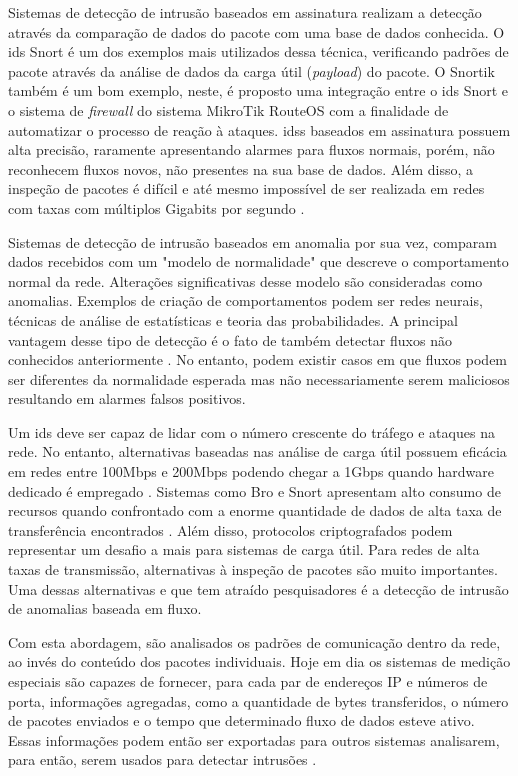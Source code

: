 Sistemas de detecção de intrusão baseados em assinatura realizam a detecção através da comparação de dados do pacote com uma base de dados conhecida. O \gls{ids} Snort \cite{Roesch:1999} é um dos exemplos mais utilizados dessa técnica, verificando padrões de pacote através da análise de dados da carga útil (\textit{payload}) do pacote. O Snortik \cite{Fagundes16} também é um bom exemplo, neste, é proposto uma integração entre o \gls{ids} Snort e o sistema de \textit{firewall} do sistema MikroTik RouteOS \cite{mikrotik16} com a finalidade de automatizar o processo de reação à ataques. \glspl{ids} baseados em assinatura possuem alta precisão, raramente apresentando alarmes para fluxos normais, porém, não reconhecem fluxos novos, não presentes na sua base de dados. Além disso, a inspeção de pacotes é difícil e até mesmo impossível de ser realizada  em redes com taxas com múltiplos Gigabits por segundo \cite{Lai:2004, Gao:2006}.

Sistemas de detecção de intrusão baseados em anomalia por sua vez, comparam dados recebidos com um "modelo de normalidade" que descreve o comportamento normal da rede. Alterações significativas desse modelo são consideradas como anomalias. Exemplos de criação de comportamentos podem ser redes neurais, técnicas de análise de estatísticas e teoria das probabilidades. A principal vantagem desse tipo de detecção é o fato de também detectar fluxos não conhecidos anteriormente \cite{Owezarski:2010}. No entanto, podem existir casos em que fluxos podem ser diferentes da normalidade esperada mas não necessariamente serem maliciosos resultando em alarmes falsos positivos.

Um \gls{ids} deve ser capaz de lidar com o número crescente do tráfego e ataques na rede. No entanto, alternativas baseadas nas análise de carga útil possuem eficácia em redes entre 100Mbps e 200Mbps \cite{Lai:2004, Gao:2006} podendo chegar a 1Gbps quando hardware dedicado é empregado \cite{Vasiliadis:2008}. Sistemas como Bro \cite{Paxson:1999} e Snort \cite{Roesch:1999} apresentam alto consumo de recursos  quando confrontado com a enorme quantidade de dados de alta taxa de transferência encontrados \cite{Dreger:2004}. Além disso, protocolos criptografados podem representar um desafio a mais para sistemas de carga útil. Para redes de alta taxas de transmissão, alternativas à inspeção de pacotes são muito importantes. Uma dessas alternativas e que tem atraído pesquisadores é a detecção de intrusão de anomalias baseada em fluxo.

Com esta abordagem, são analisados os padrões de comunicação dentro da rede, ao invés do conteúdo dos pacotes individuais. Hoje em dia os sistemas de medição especiais são capazes de fornecer, para cada par de endereços IP e números de porta, informações agregadas, como a quantidade de bytes transferidos, o número de pacotes enviados e o tempo que determinado fluxo de dados esteve ativo. Essas informações podem então ser exportadas para outros sistemas analisarem, para então, serem usados para detectar intrusões \cite{Sperotto:2010}.

